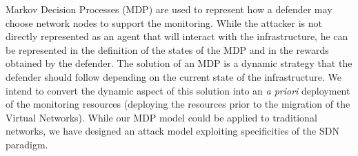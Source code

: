 Markov Decision Processes (MDP) are used to represent how a defender may choose network nodes to support the monitoring.
While the attacker is not directly represented as an agent that will interact with the infrastructure, he can be represented in the definition of the states of the MDP and in the rewards obtained by the defender.
The solution of an MDP is a dynamic strategy that the defender should follow depending on the current state of the infrastructure.
We intend to convert the dynamic aspect of this solution into an \textit{a priori} deployment of the monitoring resources (\ie deploying the resources prior to the migration of the Virtual Networks).
While our MDP model could be applied to traditional networks, we have designed an attack model exploiting specificities of the SDN paradigm.